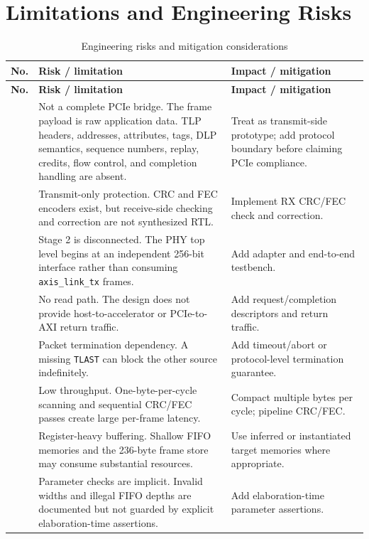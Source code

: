 \documentclass[11pt,a4paper]{article}
\newcommand{\code}[1]{\texttt{#1}}
\begin{document}
\section{Limitations and Engineering Risks}

\begin{longtable}{>{\raggedright\arraybackslash}p{} >{\raggedright\arraybackslash}p{} >{\raggedright\arraybackslash}p{}}
\caption{Engineering risks and mitigation considerations}\\
\toprule
\textbf{No.} & \textbf{Risk / limitation} & \textbf{Impact / mitigation} \\
\midrule
\endfirsthead
\toprule
\textbf{No.} & \textbf{Risk / limitation} & \textbf{Impact / mitigation} \\
\midrule
\endhead
1 & Not a complete PCIe bridge. The frame payload is raw application data. TLP headers, addresses, attributes, tags, DLP semantics, sequence numbers, replay, credits, flow control, and completion handling are absent. & Treat as transmit-side prototype; add protocol boundary before claiming PCIe compliance. \\
2 & Transmit-only protection. CRC and FEC encoders exist, but receive-side checking and correction are not synthesized RTL. & Implement RX CRC/FEC check and correction. \\
3 & Stage 2 is disconnected. The PHY top level begins at an independent 256-bit interface rather than consuming \code{axis\_link\_tx} frames. & Add adapter and end-to-end testbench. \\
4 & No read path. The design does not provide host-to-accelerator or PCIe-to-AXI return traffic. & Add request/completion descriptors and return traffic. \\
5 & Packet termination dependency. A missing \code{TLAST} can block the other source indefinitely. & Add timeout/abort or protocol-level termination guarantee. \\
6 & Low throughput. One-byte-per-cycle scanning and sequential CRC/FEC passes create large per-frame latency. & Compact multiple bytes per cycle; pipeline CRC/FEC. \\
7 & Register-heavy buffering. Shallow FIFO memories and the 236-byte frame store may consume substantial resources. & Use inferred or instantiated target memories where appropriate. \\
8 & Parameter checks are implicit. Invalid widths and illegal FIFO depths are documented but not guarded by explicit elaboration-time assertions. & Add elaboration-time parameter assertions. \\

\end{longtable}
\end{document}
